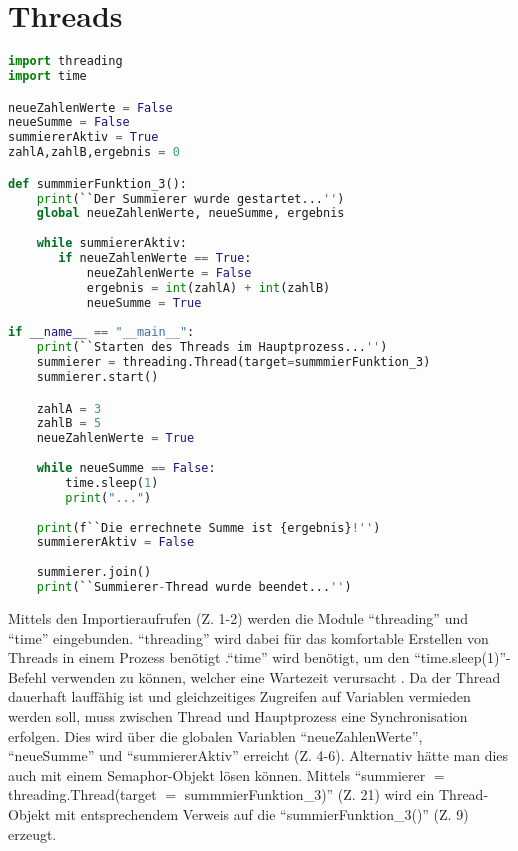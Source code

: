\section{Threads}
\begin{lstlisting}[language=Python,caption={Beispiel f"ur die Verwendung von Threads},captionpos=b]
import threading
import time

neueZahlenWerte = False
neueSumme = False
summiererAktiv = True
zahlA,zahlB,ergebnis = 0

def summmierFunktion_3():
    print(``Der Summierer wurde gestartet...'')
    global neueZahlenWerte, neueSumme, ergebnis
    
    while summiererAktiv:
       if neueZahlenWerte == True:
           neueZahlenWerte = False
           ergebnis = int(zahlA) + int(zahlB)
           neueSumme = True
            
if __name__ == "__main__":    
    print(``Starten des Threads im Hauptprozess...'')
    summierer = threading.Thread(target=summmierFunktion_3)
    summierer.start()

    zahlA = 3
    zahlB = 5
    neueZahlenWerte = True
    
    while neueSumme == False:
        time.sleep(1)
        print("...")
    
    print(f``Die errechnete Summe ist {ergebnis}!'')    
    summiererAktiv = False  
     
    summierer.join()
    print(``Summierer-Thread wurde beendet...'')
\end{lstlisting}
Mittels den Importieraufrufen (Z. 1-2) werden die Module ``threading'' und ``time'' eingebunden. 
``threading'' wird dabei für das komfortable Erstellen von Threads in einem Prozess benötigt \cite{PythonSoftwareFoundation.}.``time'' wird benötigt, um den ``time.sleep(1)''-Befehl verwenden zu können, welcher eine Wartezeit verursacht \cite{PythonSoftwareFoundation.c}. 
Da der Thread dauerhaft lauffähig ist und gleichzeitiges Zugreifen auf Variablen vermieden werden soll, muss zwischen Thread und Hauptprozess eine Synchronisation erfolgen. Dies wird über die globalen Variablen ``neueZahlenWerte'', ``neueSumme'' und ``summiererAktiv'' erreicht (Z. 4-6). Alternativ hätte man dies auch mit einem Semaphor-Objekt lösen können.
Mittels ``summierer $=$ threading.Thread(target $=$ summmierFunktion\_3)'' (Z. 21) wird ein Thread-Objekt mit entsprechendem Verweis auf die ``summierFunktion\_3()'' (Z. 9) erzeugt. 
